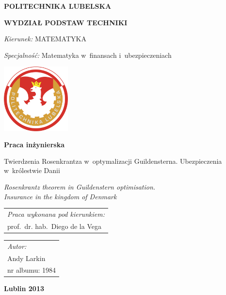 \documentclass[12pt]{mwbk}
\theoremstyle{plain}
\theoremstyle{definition}
\theoremstyle{remark}
\begin{document}

\thispagestyle{empty}  %

\begin{center}


{\large \bf POLITECHNIKA LUBELSKA}

{\bf WYDZIAŁ PODSTAW TECHNIKI}

\emph{Kierunek:} MATEMATYKA

\emph{Specjalność:} Matematyka w~finansach i~ubezpieczeniach

\vfill %
     

\includegraphics[width=3.5cm]{img/logopl}

\vfill

\textbf{Praca inżynierska}

\vfill
\vfill
\vfill

\large
Twierdzenia Rosenkrantza w~optymalizacji Guildensterna.
Ubezpieczenia w~królestwie Danii

\vfill

\emph{Rosenkrantz theorem in Guildenstern optimisation.\\
Insurance in the kingdom of Denmark}


\vfill
\vfill
\vfill
\vfill
\vfill

\begin{tabular}[t]{l}
\emph{Praca wykonana pod kierunkiem:}
\\
prof.~dr. hab.~Diego de la Vega
\end{tabular}
\hfill
\begin{tabular}[t]{l}
	\emph{Autor:}
\\
Andy Larkin\\
nr albumu: 1984 
\end{tabular}

\vfill
\vfill
\vfill

\textbf{Lublin 2013}

\end{center}
\end{document}
